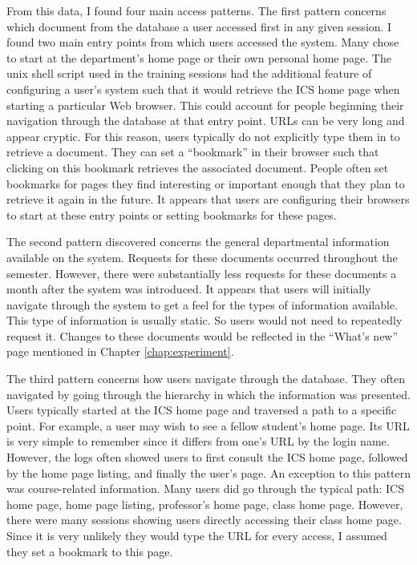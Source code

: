 From this data, I found four main access patterns.  The first pattern concerns
which document from the database a user accessed first in any given session.  I
found two main entry points from which users accessed the system.  Many chose
to start at the department's home page or their own personal home page.  The
unix shell script used in the training sessions had the additional feature of
configuring a user's system such that it would retrieve the ICS home page when
starting a particular Web browser.  This could account for people beginning
their navigation through the database at that entry point.  URLs can be very
long and appear cryptic.  For this reason, users typically do not explicitly
type them in to retrieve a document.  They can set a ``bookmark'' in their
browser such that clicking on this bookmark retrieves the associated document.
People often set bookmarks for pages they find interesting or important enough
that they plan to retrieve it again in the future.  It appears that users are
configuring their browsers to start at these entry points or setting bookmarks
for these pages.

The second pattern discovered concerns the general departmental information
available on the system.  Requests for these documents occurred throughout the
semester.  However, there were substantially less requests for these documents
a month after the system was introduced.  It appears that users will initially
navigate through the system to get a feel for the types of information
available.  This type of information is usually static.  So users would not
need to repeatedly request it.  Changes to these documents would be reflected
in the ``What's new'' page mentioned in Chapter \ref{chap:experiment}.

The third pattern concerns how users navigate through the database.  They often
navigated by going through the hierarchy in which the information was
presented.  Users typically started at the ICS home page and traversed a path
to a specific point.  For example, a user may wish to see a fellow student's
home page.  Its URL is very simple to remember since it differs from one's URL
by the login name.  However, the logs often showed users to first consult the
ICS home page, followed by the home page listing, and finally the user's page.
An exception to this pattern was course-related information.  Many users did go
through the typical path: ICS home page, home page listing, professor's home
page, class home page.  However, there were many sessions showing users
directly accessing their class home page.  Since it is very unlikely they would
type the URL for every access, I assumed they set a bookmark to this page.

